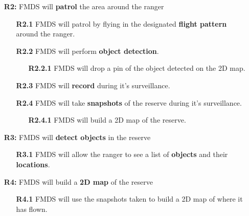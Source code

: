 \begin{flushleft}
\begin{itemize}
	\item [\textbf{R2:}] FMDS will \textbf{patrol} the area around the ranger

		\begin{itemize}
			\item [\textbf{R2.1}] FMDS will patrol by flying in the designated \textbf{flight pattern} around the ranger.
			\item [\textbf{R2.2}] FMDS will perform \textbf{object detection}.
				\begin{itemize}
					\item [\textbf{R2.2.1}] FMDS will drop a pin of the object detected on the 2D map.
				\end{itemize}
			\item [\textbf{R2.3}] FMDS will \textbf{record} during it's surveillance.
			\item [\textbf{R2.4}] FMDS will take \textbf{snapshots} of the reserve during it's surveillance.
				\begin{itemize}
					\item [\textbf{R2.4.1}] FMDS will build a 2D map of the reserve.
				\end{itemize}
		\end{itemize}
\end{itemize}

\begin{itemize}
	\item  [\textbf{R3:}] FMDS will \textbf{detect objects} in the reserve

		\begin{itemize}
			\item  [\textbf{R3.1}] FMDS will allow the ranger to see a list of \textbf{objects} and their \textbf{locations}.
		\end{itemize}
\end{itemize}

\begin{itemize}
	\item  [\textbf{R4:}] FMDS will build a \textbf{2D map} of the reserve

		\begin{itemize}
			\item  [\textbf{R4.1}] FMDS will use the snapshots taken to build a 2D map of where it has flown.
		\end{itemize}
\end{itemize}
\end{flushleft}


